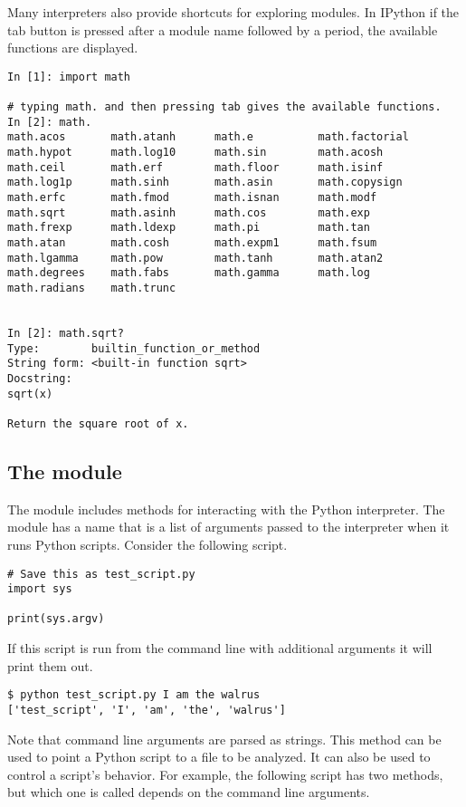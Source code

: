 Many interpreters also provide shortcuts for exploring modules.
In IPython if the tab button is pressed after a module name followed by a period, the available functions are displayed.

\begin{lstlisting}
In [1]: import math

# typing math. and then pressing tab gives the available functions.
In [2]: math.
math.acos       math.atanh      math.e          math.factorial  
math.hypot      math.log10      math.sin        math.acosh      
math.ceil       math.erf        math.floor      math.isinf      
math.log1p      math.sinh       math.asin       math.copysign   
math.erfc       math.fmod       math.isnan      math.modf       
math.sqrt       math.asinh      math.cos        math.exp        
math.frexp      math.ldexp      math.pi         math.tan        
math.atan       math.cosh       math.expm1      math.fsum       
math.lgamma     math.pow        math.tanh       math.atan2      
math.degrees    math.fabs       math.gamma      math.log        
math.radians    math.trunc


In [2]: math.sqrt?
Type:        builtin_function_or_method
String form: <built-in function sqrt>
Docstring:
sqrt(x)

Return the square root of x.
\end{lstlisting}

\subsection*{The  module}

The  module includes methods for interacting with the Python interpreter.
The module has a name  that is a list of arguments passed to the interpreter when it runs Python scripts.
Consider the following script.

\begin{lstlisting}
# Save this as test_script.py
import sys

print(sys.argv)
\end{lstlisting}

If this script is run from the command line with additional arguments it will print them out.

\begin{lstlisting}
$ python test_script.py I am the walrus
['test_script', 'I', 'am', 'the', 'walrus']
\end{lstlisting}

Note that command line arguments are parsed as strings.
This method can be used to point a Python script to a file to be analyzed.
It can also be used to control a script's behavior.
For example, the following script has two methods, but which one is called depends on the command line arguments.

